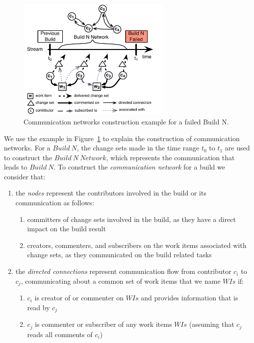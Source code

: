 \documentclass[12pt,oneside]{book}
\begin{document}
\begin{figure}[t]
\begin{center}
\includegraphics[width=7.5cm]{figures/BuildResultNetworks3}
\caption{Communication networks construction example for a failed Build N.}
\label{fig:NetworkConstructionExample}
\end{center}
\end{figure}

We use the example in Figure~\ref{fig:NetworkConstructionExample} to explain the
construction of communication networks. For a $Build~N$, the change sets made in
the time range $t_0$ to $t_1$ are used to construct the $Build~N~Network$, which
represents the communication that leads to $Build~N$. To construct the
\emph{communication network} for a build we consider that:

\begin{enumerate}
  \item the \emph{nodes} represent the contributors involved in the build or 
 its communication as follows:
  \begin{enumerate}
    \item committers of change sets involved in the build, as they have a
    direct impact on the build result
    \item creators, commenters, and subscribers on the work items associated with
    change sets, as they communicated on the build related tasks
  \end{enumerate}
  \item the \emph{directed connections} represent communication flow
  from contributor $c_i$ to $c_j$, communicating about a common set of
  work items that we name $WIs$ if:
  \begin{enumerate}
    \item $c_i$ is creator of or commenter on $WIs$ and provides
    information that is read by $c_j$
    \item $c_j$ is commenter or subscriber of any work items $WIs$ (assuming
    that $c_j$ reads all comments of $c_i$)
  \end{enumerate}
\end{enumerate}
\end{document}
